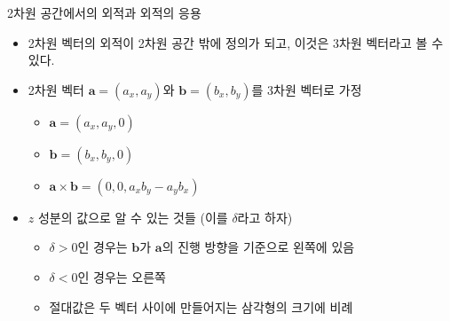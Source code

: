 \begin{frame}{2차원 공간에서의 외적과 외적의 응용}
\begin{itemize}
\item 2차원 벡터의 외적이 2차원 공간 밖에 정의가 되고, 이것은 3차원 벡터라고 볼 수 있다.
\item 2차원 벡터 $\mathbf a = (a_x, a_y)$와 $\mathbf b= (b_x, b_y)$를 3차원 벡터로 가정
	\begin{itemize}
	\item $\mathbf a = (a_x , a_y, 0)$
	\item $\mathbf b = (b_x , b_y, 0)$
	\item $\mathbf a \times \mathbf b = (0, 0, a_x b_y - a_y b_x )$
	\end{itemize}
\end{itemize}

\begin{itemize}
\item $z$ 성분의 값으로 알 수 있는 것들  (이를 $\delta$라고 하자) 
	\begin{itemize}
	\item $\delta>0$인 경우는 $\mathbf b$가 $\mathbf a$의 진행 방향을 기준으로 왼쪽에 있음
	\item $\delta<0$인 경우는 오른쪽
	\item 절대값은 두 벡터 사이에 만들어지는 삼각형의 크기에 비례
	\end{itemize}
\end{itemize}

\end{frame}


